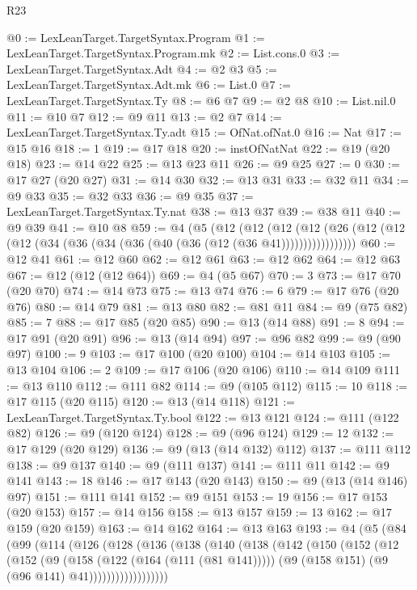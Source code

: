 \begin{lexlean}{R23}
\begin{coremodule}
{{{{{{{{{{{{{{{{{{{{{{{{{{{{{{{{{{{{{{{{{{{{{{{{{{{{{{{{{{{{{{{{{{{{{{{{{{{{{{{{{{{{{{{{{{{{{@0 := LexLeanTarget.TargetSyntax.Program
@1 := LexLeanTarget.TargetSyntax.Program.mk
@2 := List.cons.{0}
@3 := LexLeanTarget.TargetSyntax.Adt
@4 := @2 @3
@5 := LexLeanTarget.TargetSyntax.Adt.mk
@6 := List.{0}
@7 := LexLeanTarget.TargetSyntax.Ty
@8 := @6 @7
@9 := @2 @8
@10 := List.nil.{0}
@11 := @10 @7
@12 := @9 @11
@13 := @2 @7
@14 := LexLeanTarget.TargetSyntax.Ty.adt
@15 := OfNat.ofNat.{0}
@16 := Nat
@17 := @15 @16
@18 := 1
@19 := @17 @18
@20 := instOfNatNat
@22 := @19 (@20 @18)
@23 := @14 @22
@25 := @13 @23 @11
@26 := @9 @25
@27 := 0
@30 := @17 @27 (@20 @27)
@31 := @14 @30
@32 := @13 @31
@33 := @32 @11
@34 := @9 @33
@35 := @32 @33
@36 := @9 @35
@37 := LexLeanTarget.TargetSyntax.Ty.nat
@38 := @13 @37
@39 := @38 @11
@40 := @9 @39
@41 := @10 @8
@59 := @4
    (@5
      (@12
        (@12
          (@12 (@12 (@26 (@12 (@12 (@12 (@34 (@36 (@34 (@36 (@40 (@36 (@12 (@36 @41)))))))))))))))))
@60 := @12 @41
@61 := @12 @60
@62 := @12 @61
@63 := @12 @62
@64 := @12 @63
@67 := @12 (@12 (@12 @64))
@69 := @4 (@5 @67)
@70 := 3
@73 := @17 @70 (@20 @70)
@74 := @14 @73
@75 := @13 @74
@76 := 6
@79 := @17 @76 (@20 @76)
@80 := @14 @79
@81 := @13 @80
@82 := @81 @11
@84 := @9 (@75 @82)
@85 := 7
@88 := @17 @85 (@20 @85)
@90 := @13 (@14 @88)
@91 := 8
@94 := @17 @91 (@20 @91)
@96 := @13 (@14 @94)
@97 := @96 @82
@99 := @9 (@90 @97)
@100 := 9
@103 := @17 @100 (@20 @100)
@104 := @14 @103
@105 := @13 @104
@106 := 2
@109 := @17 @106 (@20 @106)
@110 := @14 @109
@111 := @13 @110
@112 := @111 @82
@114 := @9 (@105 @112)
@115 := 10
@118 := @17 @115 (@20 @115)
@120 := @13 (@14 @118)
@121 := LexLeanTarget.TargetSyntax.Ty.bool
@122 := @13 @121
@124 := @111 (@122 @82)
@126 := @9 (@120 @124)
@128 := @9 (@96 @124)
@129 := 12
@132 := @17 @129 (@20 @129)
@136 := @9 (@13 (@14 @132) @112)
@137 := @111 @112
@138 := @9 @137
@140 := @9 (@111 @137)
@141 := @111 @11
@142 := @9 @141
@143 := 18
@146 := @17 @143 (@20 @143)
@150 := @9 (@13 (@14 @146) @97)
@151 := @111 @141
@152 := @9 @151
@153 := 19
@156 := @17 @153 (@20 @153)
@157 := @14 @156
@158 := @13 @157
@159 := 13
@162 := @17 @159 (@20 @159)
@163 := @14 @162
@164 := @13 @163
@193 := @4
    (@5
      (@84
        (@99
          (@114
            (@126
              (@128
                (@136
                  (@138
                    (@140
                      (@138
                        (@142
                          (@150
                            (@152
                              (@12
                                (@152
                                  (@9
                                    (@158 (@122 (@164 (@111 (@81 @141)))))
                                    (@9 (@158 @151) (@9 (@96 @141) @41))))))))))))))))))
}}}}}}}}}}}}}}}}}}}}}}}}}}}}}}}}}}}}}}}}}}}}}}}}}}}}}}}}}}}}}}}}}}}}}}}}}}}}}}}}}}}}}}}}}}}}}
\end{coremodule}
\end{lexlean}
